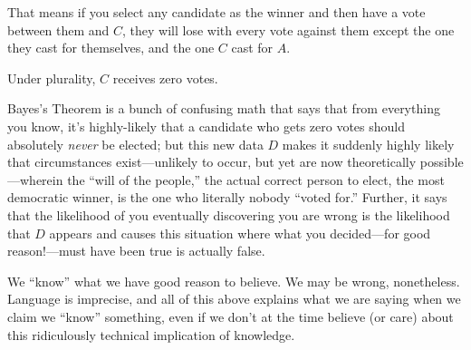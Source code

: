 That means if you select any candidate as the winner and then have a vote between them and $C$, they will lose with every vote against them except the one they cast for themselves, and the one $C$ cast for $A$.

Under plurality, $C$ receives zero votes.

Bayes's Theorem is a bunch of confusing math that says that from everything you know, it's highly-likely that a candidate who gets zero votes should absolutely \textit{never} be elected; but this new data $D$ makes it suddenly highly likely that circumstances exist—unlikely to occur, but yet are now theoretically possible—wherein the ``will of the people,'' the actual correct person to elect, the most democratic winner, is the one who literally nobody ``voted for.''  Further, it says that the likelihood of you eventually discovering you are wrong is the likelihood that $D$ appears and causes this situation where what you decided—for good reason!—must have been true is actually false.

We ``know'' what we have good reason to believe.  We may be wrong, nonetheless.  Language is imprecise, and all of this above explains what we are saying when we claim we ``know'' something, even if we don't at the time believe (or care) about this ridiculously technical implication of knowledge.